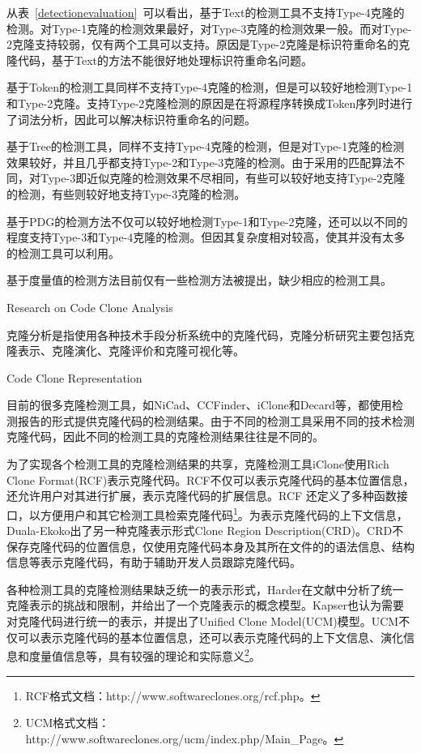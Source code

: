 从表~\ref{detectionevaluation}~可以看出，基于Text的检测工具不支持Type-4克隆的检测。对Type-1克隆的检测效果最好，对Type-3克隆的检测效果一般。而对Type-2克隆支持较弱，仅有两个工具可以支持。原因是Type-2克隆是标识符重命名的克隆代码，基于Text的方法不能很好地处理标识符重命名问题。

基于Token的检测工具同样不支持Type-4克隆的检测，但是可以较好地检测Type-1和Type-2克隆。支持Type-2克隆检测的原因是在将源程序转换成Token序列时进行了词法分析，因此可以解决标识符重命名的问题。

基于Tree的检测工具，同样不支持Type-4克隆的检测，但是对Type-1克隆的检测效果较好，并且几乎都支持Type-2和Type-3克隆的检测。由于采用的匹配算法不同，对Type-3即近似克隆的检测效果不尽相同，有些可以较好地支持Type-2克隆的检测，有些则较好地支持Type-3克隆的检测。

基于PDG的检测方法不仅可以较好地检测Type-1和Type-2克隆，还可以以不同的程度支持Type-3和Type-4克隆的检测。但因其复杂度相对较高，使其并没有太多的检测工具可以利用。

基于度量值的检测方法目前仅有一些检测方法被提出\cite{kontogiannis1996pattern,mayrand1996experiment}，缺少相应的检测工具。

{ Research on Code Clone Analysis}

克隆分析是指使用各种技术手段分析系统中的克隆代码，克隆分析研究主要包括克隆表示、克隆演化、克隆评价和克隆可视化等。

{Code Clone Representation}

目前的很多克隆检测工具，如NiCad、CCFinder、iClone和Decard等，都使用检测报告的形式提供克隆代码的检测结果。由于不同的检测工具采用不同的技术检测克隆代码，因此不同的检测工具的克隆检测结果往往是不同的。

为了实现各个检测工具的克隆检测结果的共享，克隆检测工具iClone使用Rich Clone Format(RCF)表示克隆代码\cite{harder2011efficiently}。RCF不仅可以表示克隆代码的基本位置信息，还允许用户对其进行扩展，表示克隆代码的扩展信息。RCF 还定义了多种函数接口，以方便用户和其它检测工具检索克隆代码\footnote{RCF格式文档：http://www.softwareclones.org/rcf.php。}。为表示克隆代码的上下文信息，Duala-Ekoko出了另一种克隆表示形式Clone Region Description(CRD)\cite{duala2010clone}。CRD不保存克隆代码的位置信息，仅使用克隆代码本身及其所在文件的的语法信息、结构信息等表示克隆代码，有助于辅助开发人员跟踪克隆代码。

各种检测工具的克隆检测结果缺乏统一的表示形式，Harder在文献\cite{harder2013limits}中分析了统一克隆表示的挑战和限制，并给出了一个克隆表示的概念模型。Kapser也认为需要对克隆代码进行统一的表示，并提出了Unified Clone Model(UCM)模型\cite{kapser2012common}。UCM不仅可以表示克隆代码的基本位置信息，还可以表示克隆代码的上下文信息、演化信息和度量值信息等，具有较强的理论和实际意义\footnote{ UCM格式文档：http://www.softwareclones.org/ucm/index.php/Main\_Page。}。

